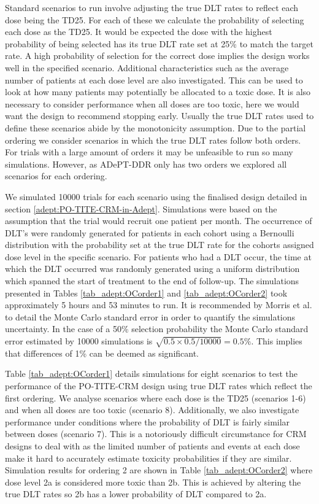 Standard scenarios to run involve adjusting the true DLT rates to reflect each dose being the TD25. For each of these we calculate the probability of selecting each dose as the TD25. It would be expected the dose with the highest probability of being selected has its true DLT rate set at 25\% to match the target rate. A high probability of selection for the correct dose implies the design works well in the specified scenario. Additional characteristics such as the average number of patients at each dose level are also investigated. This can be used to look at how many patients may potentially be allocated to a toxic dose. It is also necessary to consider performance when all doses are too toxic, here we would want the design to recommend stopping early. Usually the true DLT rates used to define these scenarios abide by the monotonicity assumption. Due to the partial ordering we consider scenarios in which the true DLT rates follow both orders. For trials with a large amount of orders it may be unfeasible to run so many simulations. However, as ADePT-DDR only has two orders we explored all scenarios for each ordering.

We simulated 10000 trials for each scenario using the finalised design detailed in section \ref{adept:PO-TITE-CRM-in-Adept}. Simulations were based on the assumption that the trial would recruit one patient per month. The occurrence of DLT's were randomly generated for patients in each cohort using a Bernoulli distribution with the probability set at the true DLT rate for the cohorts assigned dose level in the specific scenario. For patients who had a DLT occur, the time at which the DLT occurred was randomly generated using a uniform distribution which spanned the start of treatment to the end of follow-up. The simulations presented in Tables \ref{tab_adept:OCorder1} and \ref{tab_adept:OCorder2} took approximately 5 hours and 53 minutes to run. It is recommended by Morris et al. \cite{morrisUsingSimulationStudies2019} to detail the Monte Carlo standard error in order to quantify the simulations uncertainty. In the case of a 50\% selection probability the Monte Carlo standard error estimated by 10000 simulations is $\sqrt{0.5 \times 0.5/10000} = 0.5\%$. This implies that differences of 1\% can be deemed as significant. 

Table \ref{tab_adept:OCorder1} details simulations for eight scenarios to test the performance of the PO-TITE-CRM design using true DLT rates which reflect the first ordering. We analyse scenarios where each dose is the TD25 (scenarios 1-6) and when all doses are too toxic (scenario 8). Additionally, we also investigate performance under conditions where the probability of DLT is fairly similar between doses (scenario 7). This is a notoriously difficult circumstance for CRM designs to deal with as the limited number of patients and events at each dose make it hard to accurately estimate toxicity probabilities if they are similar. Simulation results for ordering 2 are shown in Table \ref{tab_adept:OCorder2} where dose level 2a is considered more toxic than 2b. This is achieved by altering the true DLT rates so 2b has a lower probability of DLT compared to 2a. 

